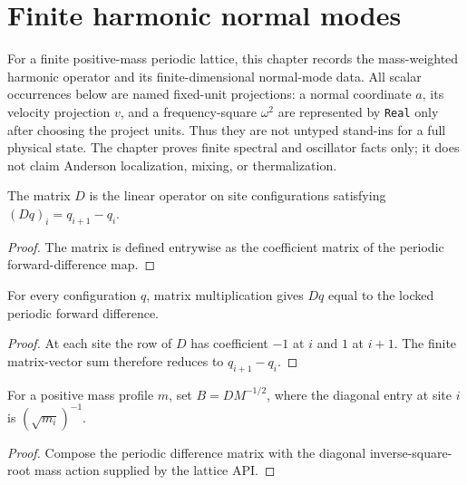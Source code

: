 
\chapter{Finite harmonic normal modes}
\label{ch:ArchonPhysics_HarmonicModes}

For a finite positive-mass periodic lattice, this chapter records the
mass-weighted harmonic operator and its finite-dimensional normal-mode data.
All scalar occurrences below are named fixed-unit projections: a normal
coordinate $a$, its velocity projection $v$, and a frequency-square
$\omega^2$ are represented by \texttt{Real} only after choosing the project
units.  Thus they are not untyped stand-ins for a full physical state.  The
chapter proves finite spectral and oscillator facts only; it does not claim
Anderson localization, mixing, or thermalization.

\begin{definition}
\label{def:harmonic:difference-matrix}
The matrix $D$ is the linear operator on site configurations satisfying
$(Dq)_i=q_{i+1}-q_i$.
\end{definition}
\begin{proof}

\leanok
The matrix is defined entrywise as the coefficient matrix of the periodic
forward-difference map.
\end{proof}

\begin{theorem}
\label{thm:harmonic:difference-matrix-mulvec}
For every configuration $q$, matrix multiplication gives $Dq$ equal to the
locked periodic forward difference.
\end{theorem}
\begin{proof}

\leanok
At each site the row of $D$ has coefficient $-1$ at $i$ and $1$ at $i+1$.
The finite matrix-vector sum therefore reduces to $q_{i+1}-q_i$.
\end{proof}

\begin{definition}
\label{def:harmonic:mass-weighted-difference}
For a positive mass profile $m$, set $B=D M^{-1/2}$, where the diagonal
entry at site $i$ is $(\sqrt{m_i})^{-1}$.
\end{definition}
\begin{proof}

\leanok
Compose the periodic difference matrix with the diagonal inverse-square-root
mass action supplied by the lattice API.
\end{proof}


